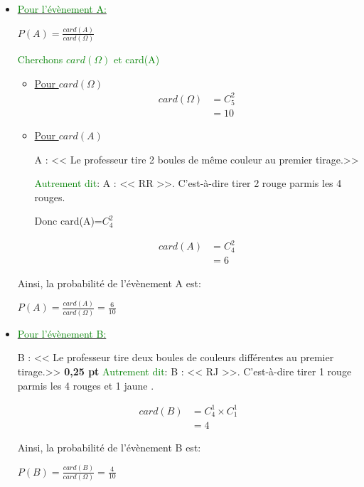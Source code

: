\documentclass[12pt]{article}
\begin{document}
\begin{itemize}
\item \underline{\textcolor{green}{Pour l'évènement A:}}

$P(A)=\frac{card(A)}{card(\Omega)}$

\textcolor{green}{Cherchons $card(\Omega)$ et card(A)}
	\begin{itemize}
	\item \underline{Pour $card(\Omega)$}
	\begin{align*}
	card(\Omega)&=C_{5}^{2}\\
			&=10
	\end{align*}
	
	\begin{center}
		\textcolor{blue}{}
	\end{center}
	\item \underline{Pour $card(A)$}
	
		A : << Le professeur tire 2 boules de même couleur au premier tirage.>>

		\textcolor{green}{Autrement dit}: A : << RR >>. C'est-à-dire tirer 2 rouge parmis les 4 rouges.

		Donc card(A)=$C_{4}^{2}$

		\begin{align*}
			card(A)&=C_{4}^{2}\\
					&=6
		\end{align*}

		\begin{center}
			\textcolor{blue}{}
		\end{center}
	\end{itemize}
	Ainsi, la probabilité de l'évènement A est:

	$P(A)=\frac{card(A)}{card(\Omega)}=\frac{6}{10}$
		\begin{center}
			\textcolor{green}{}
		\end{center}
\item \underline{\textcolor{green}{Pour l'évènement B:}}

B : << Le professeur tire deux boules de couleurs différentes au premier tirage.>>  \textbf{0,25 pt}
			\textcolor{green}{Autrement dit}: B : << RJ >>. C'est-à-dire tirer 1 rouge parmis les 4 rouges et 1 jaune .

		\begin{align*}
			card(B)&=C_{4}^{1}\times C_{1}^{1}\\
					&=4
		\end{align*}

		\begin{center}
			\textcolor{blue}{}
		\end{center}

	Ainsi, la probabilité de l'évènement B est:

	$P(B)=\frac{card(B)}{card(\Omega)}=\frac{4}{10}$
		\begin{center}
			\textcolor{green}{}
		\end{center}
\end{itemize}
\end{document}
